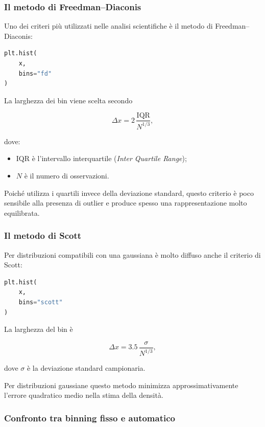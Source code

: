 \documentclass[11pt,a4paper]{book}
\begin{document}
\subsubsection{Il metodo di Freedman--Diaconis}

Uno dei criteri più utilizzati nelle analisi scientifiche è il metodo
di Freedman--Diaconis:

\begin{lstlisting}[language=Python]
plt.hist(
    x,
    bins="fd"
)
\end{lstlisting}

La larghezza dei bin viene scelta secondo

\[
\Delta x
=
2\,
\frac{\mathrm{IQR}}{N^{1/3}},
\]

dove:

\begin{itemize}
    \item $\mathrm{IQR}$ è l'intervallo interquartile
          (\emph{Inter Quartile Range});
    \item $N$ è il numero di osservazioni.
\end{itemize}

Poiché utilizza i quartili invece della deviazione standard, questo
criterio è poco sensibile alla presenza di outlier e produce spesso una
rappresentazione molto equilibrata.

\subsubsection{Il metodo di Scott}

Per distribuzioni compatibili con una gaussiana è molto diffuso anche il
criterio di Scott:

\begin{lstlisting}[language=Python]
plt.hist(
    x,
    bins="scott"
)
\end{lstlisting}

La larghezza del bin è

\[
\Delta x
=
3.5\,
\frac{\sigma}{N^{1/3}},
\]

dove $\sigma$ è la deviazione standard campionaria.

Per distribuzioni gaussiane questo metodo minimizza approssimativamente
l'errore quadratico medio nella stima della densità.

\subsubsection{Confronto tra binning fisso e automatico}
\end{document}
